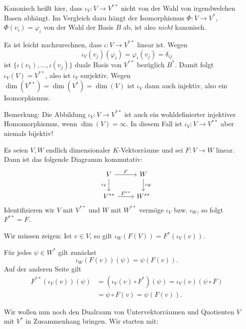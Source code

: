 Kanonisch heißt hier, dass $\iota_V \colon V \rightarrow V^{**}$ nicht von der Wahl von irgendwelchen Basen abhängt.
Im Vergleich dazu hängt der Isomorphismus $\Phi\colon V \rightarrow V^*$, $\Phi(v_i) = \varphi_i$ von der Wahl der Basis $B$ ab, ist also \textit{nicht} kanonisch. 

\begin{beweis}
	Es ist leicht nachzurechnen, dass $\iota\colon V \rightarrow V^{**}$ linear ist.
	Wegen
	\[
		\iota_V(v_j)(\varphi_i) = \varphi_i(v_j) = \delta_{ij}
	\]
	ist $\{\iota(v_1),\dots,\iota(v_j)\}$ duale Basis von $V^{**}$ bezüglich $B^*$.
	Damit folgt $\iota_V(V) = V^{**}$, also ist $\iota_V$ surjektiv.
	Wegen $\dim(V^{**}) = \dim(V^*) = \dim(V)$ ist $\iota_V$ dann auch injektiv, also ein Isomorphismus. 
\end{beweis}

Bemerkung: Die Abbildung $\iota_V \colon V \rightarrow V^{**}$ ist auch ein wohldefinierter injektiver Homomorphismus, wenn $\dim(V) = \infty$.
In diesem Fall ist $\iota_V \colon V \rightarrow V^{**}$ aber niemals bijektiv!

\begin{satz}
	\label{satz:12.12}
	Es seien $V,W$ endlich dimensionaler $K$-Vektorräume und sei $F \colon V \rightarrow W$ linear.
	Dann ist das folgende Diagramm kommutativ:
	\[
		\begin{tikzcd}
			V \arrow[r,"F"] \arrow[d,"\iota_V"'] & W \arrow[d,"\iota_W"] \\
			V^{**} \arrow[r,"F^{**}"] & W^{**}
		\end{tikzcd}
	\]
	Identifizieren wir $V$ mit $V^{**}$ und $W$ mit $W^{**}$ vermöge $\iota_V$ bzw. $\iota_W$, so folgt $F^{**} = F$.
\end{satz}

\begin{beweis}
	Wir müssen zeigen:
	Ist $v \in V$, so gilt $\iota_W(F(V)) = F^*(\iota_V(v))$.
	
	Für jedes $\psi \in W^*$ gilt zunächst
	\[
		\iota_W(F(v))(\psi) = \psi(F(v)).
	\]
	Auf der anderen Seite gilt
	\begin{align*}
		F^{**}(\iota_V(v))(\psi) &= (\iota_V(v) \circ F^*)(\psi) = \iota_V(v)(\psi \circ F) \\
		&= \psi \circ F(v) = \psi(F(v)). 
	\end{align*}
\end{beweis}

Wir wollen nun noch den Dualraum von Untervektorräumen und Quotienten $V$ mit $V^*$ in Zusammenhang bringen.
Wir starten mit:

